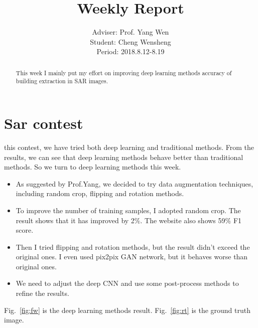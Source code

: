 \documentclass[]{IEEEtran}
\begin{document}
	\title{Weekly Report}
	\author{Adviser: Prof. Yang Wen \\Student: Cheng Wensheng\\ Period: 2018.8.12-8.19
	}
	\maketitle

\begin{abstract}
	This week I mainly put my effort on improving deep learning methods accuracy of building extraction in SAR images.
\end{abstract}

\section{Sar contest}
	 this contest, we have tried both deep learning and traditional methods. From the results, we can see that deep learning methods behave better than traditional methods. So we turn to deep learning methods this week.	
	\begin{itemize}
		\item As suggested by Prof.Yang, we decided to try data augmentation techniques, including random crop, flipping and rotation methods.
		\item To improve the number of training samples, I adopted random crop. The result shows that it has improved by 2$\%$. The website also shows 59$\%$ F1 score.
		\item Then I tried flipping and rotation methods, but the result didn't exceed the original ones. I even used pix2pix GAN network, but it behaves worse than original ones.
		\item We need to adjust the deep CNN and use some post-process methods to refine the results.
	\end{itemize}
	
	Fig.~\ref{fig:fw} is the deep learning methods result. Fig.~\ref{fig:rt} is the ground truth image.
	

\end{document}
